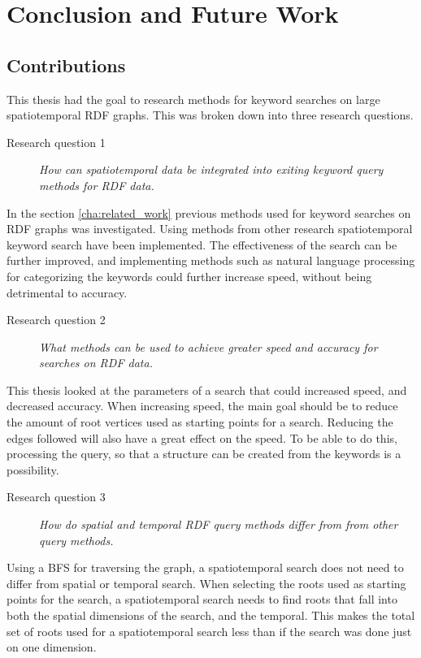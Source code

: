 \chapter{Conclusion and Future Work}
\label{cha:Conclusion}

\section{Contributions}
\label{sec:Contributions}
This thesis had the goal to research methods for keyword searches on large spatiotemporal RDF graphs. This was broken down into three research questions.

\begin{description}
    \item[Research question 1] {\em How can spatiotemporal data be integrated into exiting keyword query methods for RDF data.}
\end{description}
In the section \ref{cha:related_work} previous methods used for keyword searches on RDF graphs was investigated. Using methods from other research spatiotemporal keyword search have been implemented. The effectiveness of the search can be further improved, and implementing methods such as natural language processing for categorizing the keywords could further increase speed, without being detrimental to accuracy.

\begin{description}
    \item[Research question 2] {\em What methods can be used to achieve greater speed and accuracy for searches on RDF data.}
\end{description}

This thesis looked at the parameters of a search that could increased speed, and decreased accuracy. When increasing speed, the main goal should be to reduce the amount of root vertices used as starting points for a search. Reducing the edges followed will also have a great effect on the speed. To be able to do this, processing the query, so that a structure can be created from the keywords is a possibility.

\begin{description}
    \item[Research question 3] {\em How do spatial and temporal RDF query methods differ from from other query methods.}
\end{description}

Using a BFS for traversing the graph, a spatiotemporal search does not need to differ from spatial or temporal search. When selecting the roots used as starting points for the search, a spatiotemporal search needs to find roots that fall into both the spatial dimensions of the search, and the temporal. This makes the total set of roots used for a spatiotemporal search less than if the search was done just on one dimension.

